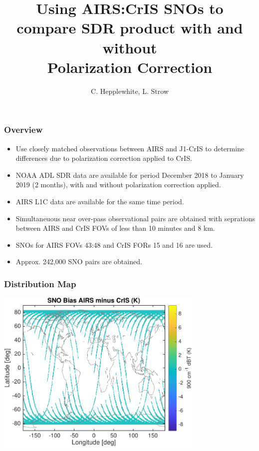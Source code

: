\documentclass[10pt,t]{beamer} \usepackage[utf8]{inputenc}
\title[]{Using AIRS:CrIS SNOs to compare SDR product with and without \\
Polarization Correction}
\author{C. Hepplewhite, L. Strow}
\newcommand{\cris}{\textsf{CrIS}\xspace}
\newcommand{\airs}{\textsf{AIRS}\xspace}
\begin{document}
\begin{frame}
  \titlepage
\end{frame}
\begin{frame}
  \frametitle{Overview}

  \begin{itemize}
  \item Use closely matched observations between \airs and J1-\cris to
    determine differences due to polarization correction applied to \cris.
  \item NOAA ADL SDR data are available for period December 2018 to January
    2019 (2 months), with and without polarization correction applied.
  \item \airs L1C data are available for the same time period.
  \item Simultaneuous near over-pass observational pairs are obtained with
    seprations between \airs and \cris FOVs of less than 10 minutes and 8 km.
  \item SNOs for \airs FOVs 43:48 and \cris FORs 15 and 16 are used.
  \item Approx. 242,000 SNO pairs are obtained.
  \end{itemize}

\end{frame}
\begin{frame}
  \frametitle{Distribution Map}
  \begin{center}
    \noindent\includegraphics[width=0.75\textwidth]{Figs/sno_airs_cris2_bias_map.pdf}
  \end{center}
\end{frame}
\end{document}
